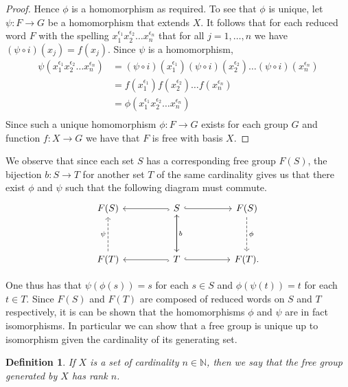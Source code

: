 \documentclass[12pt]{article}
\newtheorem{definition}{Definition}
\theoremstyle{definition}
\numberwithin{equation}{theorem}
\begin{document}
\begin{proof}
  Hence $\phi$ is a homomorphism as required. To see that $\phi$ is unique, let $\psi:F \rightarrow G$ be a homomorphism that extends $X$. It follows that for each reduced word $F$ with the spelling  $x_1^{\epsilon_1}x_2^{\epsilon_2} \dots x_n^{\epsilon_n}$ that for all $j= 1, \dots, n$ we have $(\psi \circ i) (x_j) = f(x_j)$. Since $\psi$ is a homomorphism,
  \begin{equation*}
    \begin{split}
      \psi(x_1^{\epsilon_1}x_2^{\epsilon_2} \dots x_n^{\epsilon_n}) &= (\psi \circ i)(x_1^{\epsilon_1})(\psi \circ i)(x_2^{\epsilon_2}) \dots (\psi \circ i)(x_n^{\epsilon_n}) \\
      &= f(x_1^{\epsilon_1})f(x_2^{\epsilon_2}) \dots f(x_n^{\epsilon_n}) \\
      &= \phi(x_1^{\epsilon_1}x_2^{\epsilon_2} \dots x_n^{\epsilon_n}) \\
    \end{split}
  \end{equation*}
  Since such a unique homomorphism $\phi:F \rightarrow G$ exists for each group $G$ and function $f:X \rightarrow G$ we have that $F$ is free with basis $X$.
\end{proof}

We observe that since each set $S$ has a corresponding free group $F(S)$, the bijection $b:S \rightarrow T$ for another set $T$ of the same cardinality gives us that there exist $\phi$ and $\psi$ such that the following diagram must commute.
\begin{equation*}
  \begin{tikzcd}[ampersand replacement=\&, sep=huge]
    F(S) \& S \arrow[r,hook] \arrow[l,hook]  \arrow[d,"b"] \& F(S) \arrow[d,dashrightarrow,"\phi"] \\
    F(T) \arrow[u,dashrightarrow,"\psi"] \& T \arrow[r,hook] \arrow[l,hook] \arrow[u]\& F(T).
  \end{tikzcd}
\end{equation*}

One thus has that $\psi(\phi(s)) = s$ for each $s \in S$ and $\phi(\psi(t)) = t $ for each $t \in T$. Since $F(S)$ and $F(T)$ are composed of reduced words on $S$ and $T$ respectively, it is can be shown that the homomorphisms $\phi$ and $\psi$ are in fact isomorphisms. In particular we can show that a free group is unique up to isomorphism given the cardinality of its generating set.

\begin{definition}
  If $X$ is a set of cardinality $n \in \mathbb{N}$, then we say that the free group generated by $X$ has \emph{rank} $n$.
\end{definition}
\end{document}
